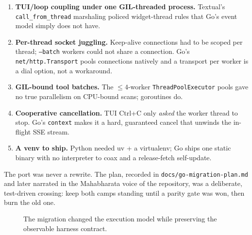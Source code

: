 \documentclass[11pt,a4paper]{article}
\begin{document}
\begin{enumerate}[leftmargin=*,itemsep=0.35em]
  \item \textbf{TUI/loop coupling under one GIL-threaded process.} Textual's \texttt{call\_from\_thread} marshaling policed widget-thread rules that Go's event model simply does not have.
  \item \textbf{Per-thread socket juggling.} Keep-alive connections had to be scoped per thread; \texttt{--batch} workers could not share a connection. Go's \texttt{net/http.Transport} pools connections natively and a transport per worker is a dial option, not a workaround.
  \item \textbf{GIL-bound tool batches.} The $\leq 4$-worker \texttt{ThreadPoolExecutor} pools gave no true parallelism on CPU-bound scans; goroutines do.
  \item \textbf{Cooperative cancellation.} TUI Ctrl+C only \emph{asked} the worker thread to stop. Go's \texttt{context} makes it a hard, guaranteed cancel that unwinds the in-flight SSE stream.
  \item \textbf{A venv to ship.} Python needed uv + a virtualenv; Go ships one static binary with no interpreter to coax and a release-fetch self-update.
\end{enumerate}

The port was never a rewrite. The plan, recorded in \texttt{docs/go-migration-plan.md} and later narrated in the Mahabharata voice of the repository, was a deliberate, test-driven crossing: keep both camps standing until a parity gate was won, then burn the old one.

\begin{figure}[ht]
\centering
{}
\caption{The migration changed the execution model while preserving the observable harness contract.}
\label{fig:architecture}
\end{figure}
\end{document}
